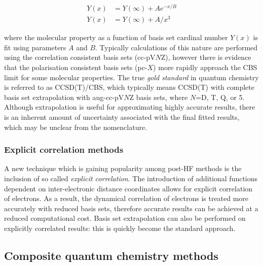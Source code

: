 \begin{align}
  Y(x) &= Y(\infty) + Ae^{-x/B} \\
  Y(x) &= Y(\infty) + A/x^3
\end{align}

\noindent where the molecular property as a function of basis set cardinal number $Y(x)$ is fit using parameters $A$ and $B$. Typically calculations of this nature are performed using the correlation consistent basis sets (cc-pV$N$Z), however there is evidence that the polarisation consistent basis sets (pc-$X$) more rapidly approach the CBS limit for some molecular properties.\cite{Kupka2007} The true \emph{gold standard} in quantum chemistry is referred to as CCSD(T)/CBS, which typically means CCSD(T) with complete basis set extrapolation with aug-cc-pV$N$Z basis sets, where $N$=D, T, Q, or 5. Although extrapolation is useful for approximating highly accurate results, there is an inherent amount of uncertainty associated with the final fitted results, which may be unclear from the nomenclature.

\subsubsection{Explicit correlation methods}

A new technique which is gaining popularity among post-HF methods is the inclusion of so called \emph{explicit correlation}.\cite{Shiozaki2008,Kohn2008} The introduction of additional functions dependent on inter-electronic distance coordinates allows for explicit correlation of electrons.\cite{Tenno2012} As a result, the dynamical correlation of electrons is treated more accurately with reduced basis sets, therefore accurate results can be achieved at a reduced computational cost. Basis set extrapolation can also be performed on explicitly correlated results: this is quickly become the standard approach.\cite{Feller2013}


\subsection{Composite quantum chemistry methods}

